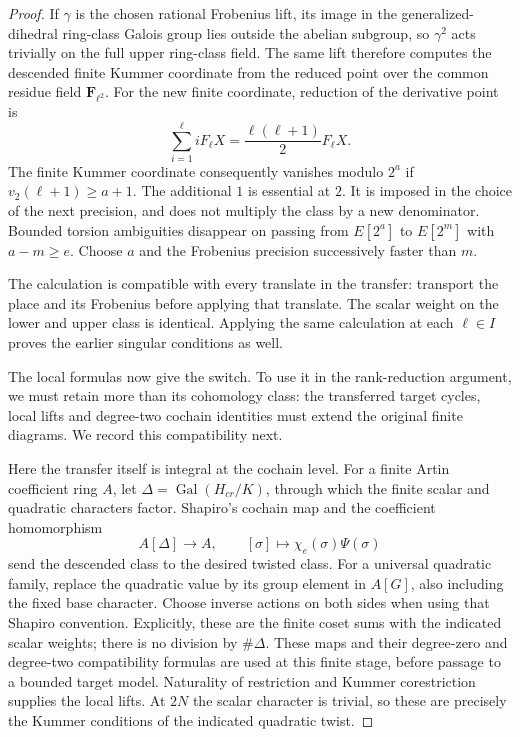 \begin{proof}
If $\gamma$ is the chosen rational Frobenius lift, its image in the
generalized-dihedral ring-class Galois group lies outside the abelian
subgroup, so $\gamma^2$ acts trivially on the full upper ring-class field.
The same lift therefore computes the descended finite Kummer coordinate
from the reduced point over the common residue field $\mathbf F_{\ell^2}$.
For the new finite coordinate, reduction of the derivative point is
\begin{equation}
 \sum_{i=1}^{\ell}iF_\ell X
       =\frac{\ell(\ell+1)}2F_\ell X.
 \label{rd:half-factor}
\end{equation}
The finite Kummer coordinate consequently vanishes modulo \(2^a\)
if \(v_2(\ell+1)\ge a+1\).  The additional \(1\) is essential at
\(2\).  It is imposed in the choice of the next precision, and does
not multiply the class by a new denominator.  Bounded torsion
ambiguities disappear on passing from \(E[2^a]\) to \(E[2^m]\) with
\(a-m\ge e\).  Choose \(a\) and the Frobenius precision successively
faster than \(m\).

The calculation is compatible with every translate in the transfer:
transport the place and its Frobenius before applying that translate.
The scalar weight on the lower and upper class is identical.  Applying
the same calculation at each \(\ell\in I\) proves the earlier
singular conditions as well.

The local formulas now give the switch. To use it in the rank-reduction
argument, we must retain more than its cohomology class: the transferred
target cycles, local lifts and degree-two cochain identities must extend
the original finite diagrams. We record this compatibility next.

Here the transfer itself is integral at the cochain level.
For a finite Artin coefficient ring \(A\), let
\(\Delta=\operatorname{Gal}(H_{cr}/K)\), through which the
finite scalar and quadratic characters factor.  Shapiro's
cochain map and the coefficient homomorphism
\[
 A[\Delta]\longrightarrow A,\qquad
 [\sigma]\longmapsto\chi_e(\sigma)\Psi(\sigma)
 \]
send the descended class to the desired twisted class.
For a universal quadratic family, replace the quadratic
value by its group element in \(A[G]\), also including the
fixed base character.  Choose inverse actions on both
sides when using that Shapiro convention.  Explicitly,
these are the finite coset sums with the indicated scalar
weights; there is no division by \(\#\Delta\).
These maps and their degree-zero and degree-two compatibility formulas
are used at this finite stage, before passage to a bounded target model.
Naturality of restriction and Kummer corestriction
supplies the local lifts. At \(2N\) the scalar character
is trivial, so these are precisely the Kummer conditions
of the indicated quadratic twist.


\end{proof}
